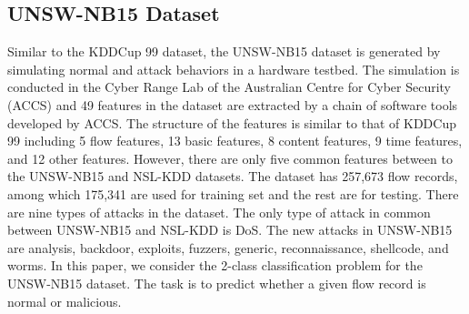 \subsection{UNSW-NB15 Dataset}
Similar to the KDDCup 99 dataset, the UNSW-NB15 dataset is generated by simulating normal and attack behaviors in a hardware testbed.
The simulation is conducted in the Cyber Range Lab of the Australian Centre for Cyber Security (ACCS) and 49 features in the dataset are extracted by a chain of software tools developed by ACCS.
The structure of the features is similar to that of KDDCup 99 including 5 flow features, 13 basic features, 8 content features, 9 time features, and 12 other features.
However, there are only five common features between to the UNSW-NB15 and NSL-KDD datasets.
The dataset has 257,673 flow records, among which 175,341 are used for
training set and the rest are for testing.
There are nine types of attacks in the dataset.
The only type of attack in common between UNSW-NB15 and NSL-KDD is DoS.
The new attacks in UNSW-NB15 are analysis, backdoor, exploits, fuzzers, generic, reconnaissance, shellcode, and worms.
In this paper, we consider the 2-class classification problem for the UNSW-NB15 dataset. The task is to predict whether a given flow record is normal or malicious.

